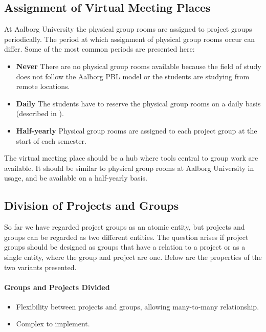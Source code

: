 \subsection{Assignment of Virtual Meeting Places}
At Aalborg University the physical group rooms are assigned to project groups periodically.
The period at which assignment of physical group rooms occur can differ.
Some of the most common periods are presented here:
\begin{itemize}
	\item \textbf{Never} There are no physical group rooms available because the field of study does not follow the Aalborg PBL model or the students are studying from remote locations.
	\item \textbf{Daily} The students have to reserve the physical group rooms on a daily basis (described in ).
	\item \textbf{Half-yearly} Physical group rooms are assigned to each project group at the start of each semester.
\end{itemize} 

The virtual meeting place should be a hub where tools central to group work are available.
It should be similar to physical group rooms at Aalborg University in usage, and be available on a half-yearly basis.


\subsection{Division of Projects and Groups}
\label{sub:divProjGroup}
So far we have regarded project groups as an atomic entity, but projects and groups can be regarded as two different entities.
The question arises if project groups should be designed as groups that have a relation to a project or as a single entity, where the group and project are one.
Below are the properties of the two variants presented.


\paragraph{Groups and Projects Divided} 
\begin{itemize}
	\item Flexibility between projects and groups, allowing many-to-many relationship.
	\item Complex to implement.
\end{itemize}


